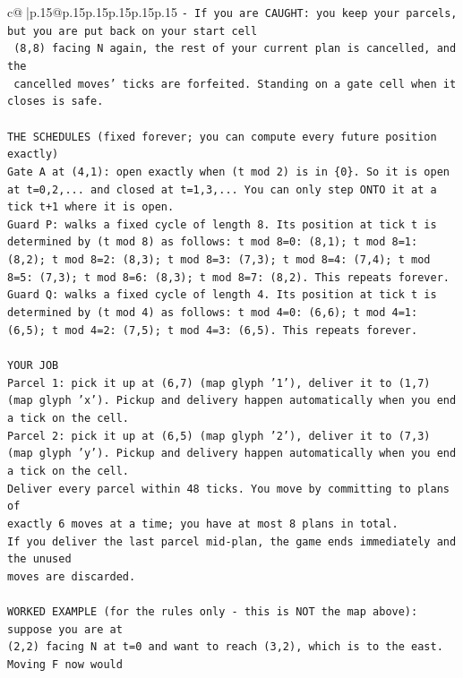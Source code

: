 \documentclass{article}
\begin{document}
{\begin{supertabular}{c@{$\;$}|p{.15\linewidth}@{}p{.15\linewidth}p{.15\linewidth}p{.15\linewidth}p{.15\linewidth}p{.15\linewidth}}
{{{\texttt{{-} If you are CAUGHT: you keep your parcels, but you are put back on your start cell} \\
\texttt{  (8,8) facing N again, the rest of your current plan is cancelled, and the} \\
\texttt{  cancelled moves' ticks are forfeited. Standing on a gate cell when it closes is safe.} \\
\\ 
\texttt{THE SCHEDULES (fixed forever; you can compute every future position exactly)} \\
\texttt{Gate A at (4,1): open exactly when (t mod 2) is in \{0\}. So it is open at t=0,2,... and closed at t=1,3,... You can only step ONTO it at a tick t+1 where it is open.} \\
\texttt{Guard P: walks a fixed cycle of length 8. Its position at tick t is determined by (t mod 8) as follows: t mod 8=0: (8,1); t mod 8=1: (8,2); t mod 8=2: (8,3); t mod 8=3: (7,3); t mod 8=4: (7,4); t mod 8=5: (7,3); t mod 8=6: (8,3); t mod 8=7: (8,2). This repeats forever.} \\
\texttt{Guard Q: walks a fixed cycle of length 4. Its position at tick t is determined by (t mod 4) as follows: t mod 4=0: (6,6); t mod 4=1: (6,5); t mod 4=2: (7,5); t mod 4=3: (6,5). This repeats forever.} \\
\\ 
\texttt{YOUR JOB} \\
\texttt{Parcel 1: pick it up at (6,7) (map glyph '1'), deliver it to (1,7) (map glyph 'x'). Pickup and delivery happen automatically when you end a tick on the cell.} \\
\texttt{Parcel 2: pick it up at (6,5) (map glyph '2'), deliver it to (7,3) (map glyph 'y'). Pickup and delivery happen automatically when you end a tick on the cell.} \\
\texttt{Deliver every parcel within 48 ticks. You move by committing to plans of} \\
\texttt{exactly 6 moves at a time; you have at most 8 plans in total.} \\
\texttt{If you deliver the last parcel mid{-}plan, the game ends immediately and the unused} \\
\texttt{moves are discarded.} \\
\\ 
\texttt{WORKED EXAMPLE (for the rules only {-} this is NOT the map above): suppose you are at} \\
\texttt{(2,2) facing N at t=0 and want to reach (3,2), which is to the east. Moving F now would} \\
}}}
\end{supertabular}}
\end{document}
